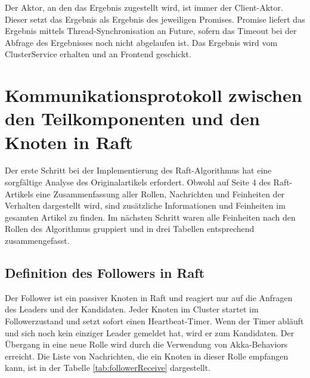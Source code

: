 Der Aktor, an den das Ergebnis zugestellt wird, ist immer der Client-Aktor. Dieser setzt das Ergebnis als Ergebnis des jeweiligen Promises. Promise liefert das Ergebnis mittels Thread-Synchronisation an Future, sofern das Timeout bei der Abfrage des Ergebnisses noch nicht abgelaufen ist. Das Ergebnis wird vom ClusterService erhalten und an Frontend geschickt.

\section{Kommunikationsprotokoll zwischen den Teilkomponenten und den Knoten in Raft}

Der erste Schritt bei der Implementierung des Raft-Algorithmus hat eine sorgfältige Analyse des Originalartikels erfordert. Obwohl auf Seite 4 des Raft-Artikels eine Zusammenfassung aller Rollen, Nachrichten und Feinheiten der Verhalten dargestellt wird, sind zusätzliche Informationen und Feinheiten im gesamten Artikel zu finden. Im nächsten Schritt waren alle Feinheiten nach den Rollen des Algorithmus gruppiert und in drei Tabellen entsprechend zusammengefasst.

\subsection{Definition des Followers in Raft}

Der Follower ist ein passiver Knoten in Raft und reagiert nur auf die Anfragen des Leaders und der Kandidaten. Jeder Knoten im Cluster startet im Followerzustand und setzt sofort einen Heartbeat-Timer. Wenn der Timer abläuft und sich noch kein einziger Leader gemeldet hat, wird er zum Kandidaten. Der Übergang in eine neue Rolle wird durch die Verwendung von Akka-Behaviors erreicht. Die Liste von Nachrichten, die ein Knoten in dieser Rolle empfangen kann, ist in der Tabelle \ref{tab:followerReceive} dargestellt.

